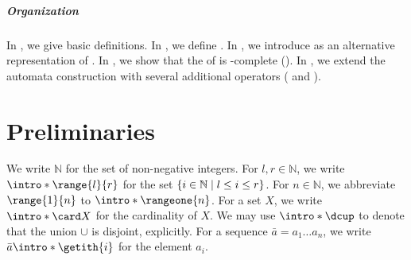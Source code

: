 \documentclass[a4paper,UKenglish,cleveref, autoref, thm-restate]{lipics-v2021}
\DeclarePairedDelimiter\set{\{}{\}}
\newcommand{\nat}{\mathbb{N}}
\newcommand{\mul}[1]{\bar{#1}}
\begin{document}
\begin{scope}
%
%
%
%

\subparagraph*{Organization}
In , we give basic definitions.
In , we define .
In , we introduce  as an alternative representation of .
In ,
we show that the  of  is -complete ().
In , we extend the automata construction with several additional operators ( and ).
\end{scope}
 
%

\section{Preliminaries}\label{section: preliminaries}
We write $\nat$ for the set of non-negative integers.
\AP
For $l, r \in \nat$, we write $\intro*\range{l}{r}$ for the set $\set{i \in \nat \mid l \le i \le r}$.
\AP
For $n \in \nat$, we abbreviate $\range{1}{n}$ to $\intro*\rangeone{n}$.
\AP
For a set $X$,
we write $\intro*\card X$ for the cardinality of $X$. %
\AP
We may use $\intro*\dcup$ to denote that the union $\cup$ is disjoint, explicitly.
\AP For a sequence $\mul{a} = a_1 \dots a_n$,
we write $\mul{a}\intro*\getith{i}$ for the element $a_i$.
\end{document}
